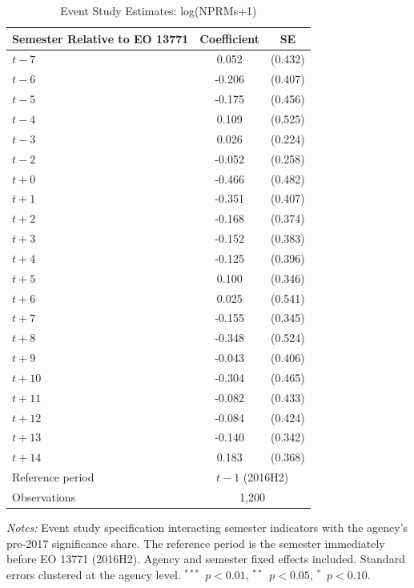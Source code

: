 \begin{table}[htbp]
\centering
\caption{Event Study Estimates: log(NPRMs+1)}
\label{tab:eventstudy}
\begin{threeparttable}
\begin{tabular}{lcc}
\toprule
Semester Relative to EO 13771 & Coefficient & SE \\
\midrule
$t-7$ & 0.052 & (0.432) \\
$t-6$ & -0.206 & (0.407) \\
$t-5$ & -0.175 & (0.456) \\
$t-4$ & 0.109 & (0.525) \\
$t-3$ & 0.026 & (0.224) \\
$t-2$ & -0.052 & (0.258) \\
$t+0$ & -0.466 & (0.482) \\
$t+1$ & -0.351 & (0.407) \\
$t+2$ & -0.168 & (0.374) \\
$t+3$ & -0.152 & (0.383) \\
$t+4$ & -0.125 & (0.396) \\
$t+5$ & 0.100 & (0.346) \\
$t+6$ & 0.025 & (0.541) \\
$t+7$ & -0.155 & (0.345) \\
$t+8$ & -0.348 & (0.524) \\
$t+9$ & -0.043 & (0.406) \\
$t+10$ & -0.304 & (0.465) \\
$t+11$ & -0.082 & (0.433) \\
$t+12$ & -0.084 & (0.424) \\
$t+13$ & -0.140 & (0.342) \\
$t+14$ & 0.183 & (0.368) \\
\midrule
Reference period & \multicolumn{2}{c}{$t-1$ (2016H2)} \\
Observations & \multicolumn{2}{c}{1,200} \\
\bottomrule
\end{tabular}
\begin{tablenotes}[flushleft]\footnotesize
\item \textit{Notes:} Event study specification interacting semester indicators with the agency's pre-2017 significance share. The reference period is the semester immediately before EO 13771 (2016H2). Agency and semester fixed effects included. Standard errors clustered at the agency level. $^{***}$~$p<0.01$, $^{**}$~$p<0.05$, $^{*}$~$p<0.10$.
\end{tablenotes}
\end{threeparttable}
\end{table}

